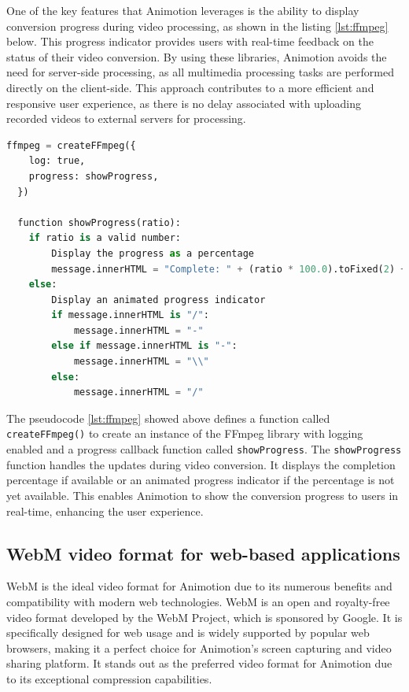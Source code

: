 One of the key features that Animotion leverages is the ability to display conversion progress during video processing, 
as shown in the listing \ref{lst:ffmpeg} below. This progress indicator provides users with real-time feedback on the status of their video conversion.
By using these libraries, Animotion avoids the need for server-side processing, as all multimedia 
processing tasks are performed directly on the client-side. This approach contributes to a more efficient and 
responsive user experience, as there is no delay associated with uploading recorded videos to external servers for processing. \cite{ffmpeg}

\begin{lstlisting}[language=Python,caption=Showing the progress of conversion,label=lst:ffmpeg]
  ffmpeg = createFFmpeg({
    log: true,
    progress: showProgress,
  })

  function showProgress(ratio):
    if ratio is a valid number:
        Display the progress as a percentage
        message.innerHTML = "Complete: " + (ratio * 100.0).toFixed(2) + "%"
    else:
        Display an animated progress indicator
        if message.innerHTML is "/":
            message.innerHTML = "-"
        else if message.innerHTML is "-":
            message.innerHTML = "\\"
        else:
            message.innerHTML = "/"
\end{lstlisting}

The pseudocode \ref{lst:ffmpeg} showed above defines a function called \texttt{createFFmpeg()} 
to create an instance of the FFmpeg library with logging enabled and a progress callback function called \texttt{showProgress}.
The \texttt{showProgress} function handles the updates during video conversion. It displays the completion percentage if 
available or an animated progress indicator if the percentage is not yet available. This enables Animotion to show the 
conversion progress to users in real-time, enhancing the user experience.

\subsection{WebM video format for web-based applications}
WebM is the ideal video format for Animotion due to its numerous benefits and compatibility with modern web technologies. 
WebM is an open and royalty-free video format developed by the WebM Project, which is sponsored by Google. It is specifically 
designed for web usage and is widely supported by popular web browsers, making it a perfect choice for Animotion's screen 
capturing and video sharing platform. It stands out as the preferred video format 
for Animotion due to its exceptional compression capabilities. 

